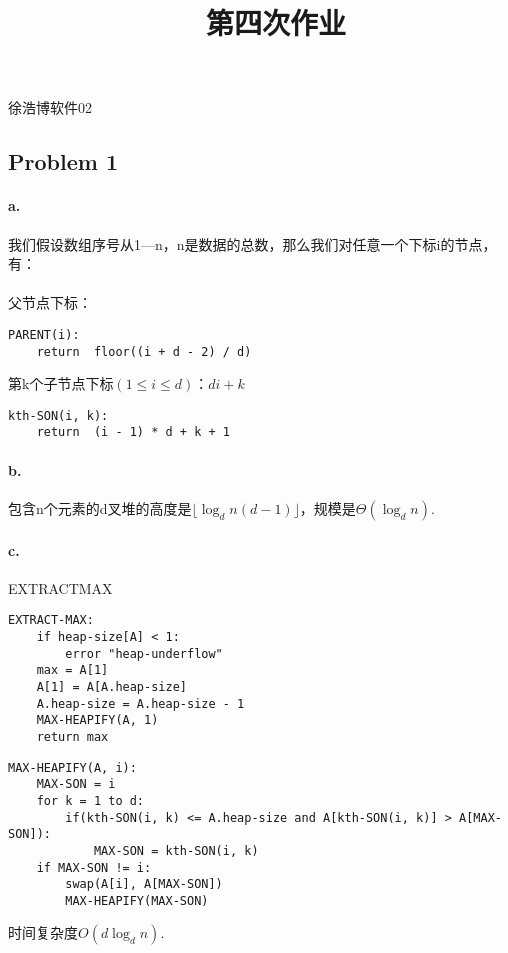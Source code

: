 \documentclass[UTF8]{ctexart}
\begin{document}
\renewcommand{\thefootnote}{\fnsymbol{footnote}}
\linespread{1.4}
\title{\vspace{-5em}\ \ 第四次作业\vspace{-2.5em}}
\date{}
\maketitle
\begin{center}
{\fangsong 徐浩博\quad 软件02}
\end{center}

\subsection*{Problem 1}
\paragraph{a. }我们假设数组序号从1—n，n是数据的总数，那么我们对任意一个下标i的节点，有：\\ \\
父节点下标：\par
\begin{lstlisting}
PARENT(i):
    return  floor((i + d - 2) / d)
\end{lstlisting}
第k个子节点下标$(1\leq i \leq d)$：$di+k$\par
\begin{lstlisting}
kth-SON(i, k):
    return  (i - 1) * d + k + 1
\end{lstlisting}
\paragraph{b. }包含n个元素的d叉堆的高度是$\lfloor \log_d{n(d-1)}\rfloor$，规模是$\Theta(\log_d n)$.\\

\paragraph{c. }EXTRACT\-MAX

\begin{lstlisting}
EXTRACT-MAX:
    if heap-size[A] < 1:
        error "heap-underflow"
    max = A[1]
    A[1] = A[A.heap-size]
    A.heap-size = A.heap-size - 1
    MAX-HEAPIFY(A, 1)
    return max    
\end{lstlisting}
\begin{lstlisting}
MAX-HEAPIFY(A, i):
    MAX-SON = i
    for k = 1 to d:
        if(kth-SON(i, k) <= A.heap-size and A[kth-SON(i, k)] > A[MAX-SON]):
            MAX-SON = kth-SON(i, k)
    if MAX-SON != i:
        swap(A[i], A[MAX-SON])
        MAX-HEAPIFY(MAX-SON)
\end{lstlisting}
时间复杂度$O(d\log_d n)$.
\end{document}
